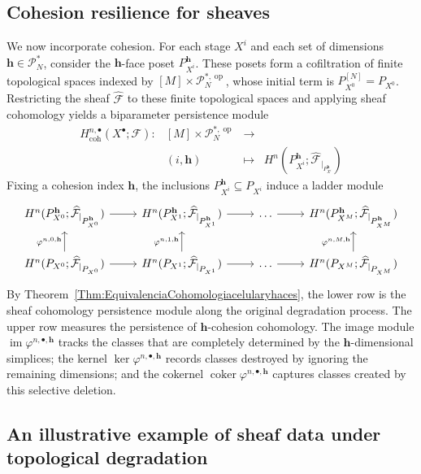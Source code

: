 \documentclass[reqno,12pt]{amsart}
\newcommand{\cF}{{\mathcal F}}
\newcommand{\cP}{\mathcal{P}}
\DeclareMathOperator{\vect}{\mathbf{vect}_\Bbbk}
\DeclareMathOperator{\img}{im}
\DeclareMathOperator{\coker}{coker}
\DeclareMathOperator{\op}{op}
\newcommand{\0}{\mathbf 0}
\newcommand{\h}{\mathbf{h}}
\theoremstyle{definition}
\begin{document}
\subsection{Cohesion resilience for sheaves}

We now incorporate cohesion. For each stage $X^i$ and each set of dimensions $\h\in\cP^{*}_N$, consider the $\h$-face poset $P_{X^i}^{\h}$. These posets form a cofiltration of finite topological spaces indexed by $[M]\times\cP^{*,\op}_N$, whose initial term is $P_{X^0}^{[N]}=P_{X^0}$. Restricting the sheaf $\widehat{\cF}$ to these finite topological spaces and applying sheaf cohomology yields a biparameter persistence module
\[
\begin{array}{rccl}
    H^{n,\bullet}_{\mathrm{coh}}(X^\bullet;\cF) \colon &[M]\times\cP^{*,\op}_N& \longrightarrow&\vect \\
    &(i,\h)&\longmapsto &H^n(P_{X^i}^{\h};\widehat{\cF}_{|_{\scriptstyle{P_{X^i}^{\h}}}})
\end{array}
\]
Fixing a cohesion index $\h$, the inclusions $P_{X^i}^{\h}\subseteq P_{X^i}$ induce a ladder module
\[
\begin{tikzcd}
H^{n}(P_{X^0}^\h;\widehat{\cF}_{|_{\scriptstyle P_{X^0}^\h}})  \arrow[r]
& H^{n}(P_{X^1}^{\h};\widehat{\cF}_{|_{\scriptstyle P_{X^1}^\h}})  \arrow[r]
& \dots \arrow[r]
& H^n(P_{X^M}^\h;\widehat{\cF}_{|_{\scriptstyle P_{X^M}^\h}})  \\
H^n(P_{X^0};\widehat{\cF}_{|_{\scriptstyle P_{X^0}}}) \arrow[u, "\varphi^{n,0,\h}"] \arrow[r]
& H^n(P_{X^1};\widehat{\cF}_{|_{\scriptstyle P_{X^1}}}) \arrow[u, "\varphi^{n,1,\h}"] \arrow[r]
& \dots \arrow[r]
& H^n(P_{X^M};\widehat{\cF}_{|_{\scriptstyle P_{X^M}}}) \arrow[u, "\varphi^{n,M,\h}"]
\end{tikzcd}
\]
By Theorem~\ref{Thm:EquivalenciaCohomologiacelularyhaces}, the lower row is the sheaf cohomology persistence module along the original degradation process. The upper row measures the persistence of $\h$-cohesion cohomology. The image module $\img\varphi^{n,\bullet,\h}$ tracks the classes that are completely determined by the $\h$-dimensional simplices; the kernel $\ker \varphi^{n,\bullet,\h}$ records classes destroyed by ignoring the remaining dimensions; and the cokernel $\coker \varphi^{n,\bullet,\h}$ captures classes created by this selective deletion. 

\subsection{An illustrative example of sheaf data under topological degradation}
\end{document}
